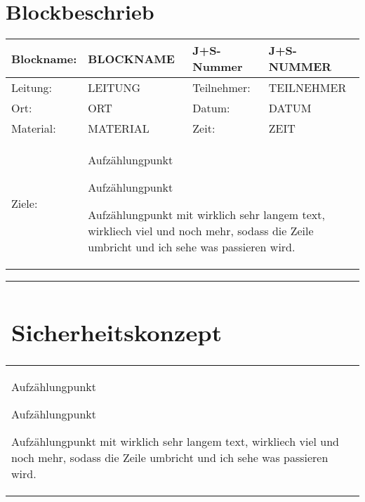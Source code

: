 \documentclass[12pt]{article}
\newcommand{\tstamp}{DATUM}
\begin{document}
\section*{Blockbeschrieb}
	\begin{tabular}{|p{2.5cm}|p{5.5cm}|p{2.5cm}|p{5.5cm}|}
	\hline
	Blockname: 	& BLOCKNAME	& J+S-Nummer	& J+S-NUMMER \\ \hline
	Leitung:		& LEITUNG		& Teilnehmer:	& TEILNEHMER \\ \hline
	Ort:			& ORT			& Datum:		& \tstamp \\ \hline
	Material:		& MATERIAL		& Zeit:		& ZEIT \\ \hline
	Ziele:		&  \multicolumn{3}{p{13.5cm+4\tabcolsep+2\arrayrulewidth}|}{\begin{compactitem} %
		\item Aufz\"ahlungpunkt
		\item Aufz\"ahlungpunkt
 		\item Aufz\"ahlungpunkt mit wirklich sehr langem text, wirkliech viel und noch mehr, sodass die Zeile umbricht und ich sehe was passieren wird. %
 	\end{compactitem}} \\
	\hline
\end{tabular}



\begin{tabular}{|p{17.5cm+3\arrayrulewidth}|}
	\hline
	\parbox[0pt][1.5cm][c]{0cm}{\section*{Sicherheitskonzept}}\\
	\hline
	\begin{compactitem}
		 \item Aufz\"ahlungpunkt
		 \item Aufz\"ahlungpunkt
 		\item Aufz\"ahlungpunkt mit wirklich sehr langem text, wirkliech viel und noch mehr, sodass die Zeile umbricht und ich sehe was passieren wird.
 	\end{compactitem}\\
 	\hline 
\end{tabular}
\end{document}

